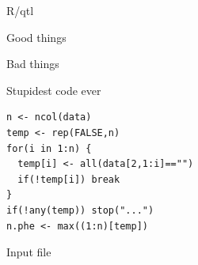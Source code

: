 \documentclass[12pt,t]{beamer}
\begin{document}
\begin{frame}[c]{R/qtl}
\end{frame}


\begin{frame}[c]{}

\centerline{\Large Good things}

\vspace{4mm}


\end{frame}


\begin{frame}{}

\vspace*{16.7mm}

\centerline{\Large Bad things}

\end{frame}

\begin{frame}[c,fragile]{Stupidest code ever}

\begin{center}
\begin{minipage}[c]{9.3cm}
\begin{semiverbatim}
\lstset{basicstyle=\normalsize}
\begin{lstlisting}[linewidth=9.3cm]
n <- ncol(data)
temp <- rep(FALSE,n)
for(i in 1:n) {
  temp[i] <- all(data[2,1:i]=="")
  if(!temp[i]) break
}
if(!any(temp)) stop("...")
n.phe <- max((1:n)[temp])
\end{lstlisting}
\end{semiverbatim}
\end{minipage}
\end{center}

\end{frame}


\begin{frame}[c]{Input file}


\end{frame}
\end{document}
